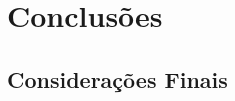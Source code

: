 \chapter{Conclusões}
\label{cap:conclusoes}


\section{Considerações Finais} 
\label{sec:consideracoes_finais}
